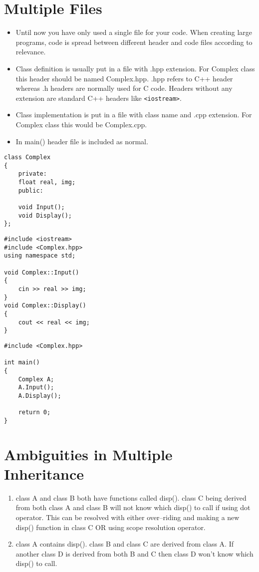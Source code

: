 \documentclass[12pt,a4paper]{article}
\begin{document}
\section{Multiple Files}
\begin{itemize}
\item Until now you have only used a single file for your code. When creating large programs, code is spread between different header and code files according to relevance.
\item Class definition is usually put in a file with .hpp extension. For Complex class this header should be named Complex.hpp. .hpp refers to C++ header whereas .h headers are normally used for C code. Headers without any extension are standard C++ headers like \verb|<iostream>|.
\item Class implementation is put in a file with class name and .cpp extension. For Complex class this would be Complex.cpp.
\item In main() header file is included as normal.
\end{itemize}
\begin{minipage}{7.5cm}
\begin{lstlisting}[caption={Complex.hpp}]
class Complex
{
	private:
	float real, img;
	public:

	void Input();
	void Display();
};
\end{lstlisting}
\end{minipage}
\hspace*{1cm}
\begin{minipage}{7.5cm}
\begin{lstlisting}[caption={Complex.cpp}]
#include <iostream>
#include <Complex.hpp>
using namespace std;

void Complex::Input()
{
	cin >> real >> img;
}
void Complex::Display()
{
	cout << real << img;
}
\end{lstlisting}
\end{minipage}
\begin{lstlisting}[caption={main.cpp}]
#include <Complex.hpp>

int main()
{
	Complex A;
	A.Input();
	A.Display();

	return 0;
}
\end{lstlisting}
\section{Ambiguities in Multiple Inheritance}
\begin{enumerate}
\item class A and class B both have functions called disp(). class C being derived from both class A and class B will not know which disp() to call if using dot operator. This can be resolved with either over--riding and making a new disp() function in class C OR using scope resolution operator.
\item class A contains disp(). class B and class C are derived from class A. If another class D is derived from both B and C then class D won't know which disp() to call.
\end{enumerate}
\end{document}
